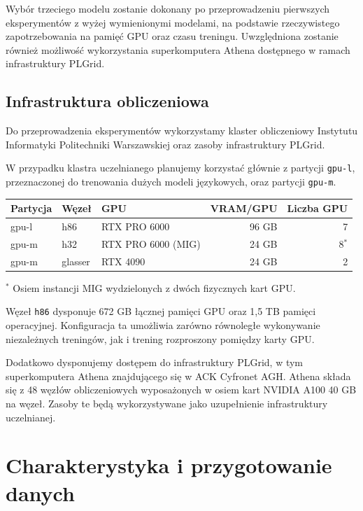 \documentclass[a4paper,10pt]{article}
\begin{document}
Wybór trzeciego modelu zostanie dokonany po przeprowadzeniu
pierwszych eksperymentów z wyżej wymienionymi modelami,
na podstawie rzeczywistego zapotrzebowania na pamięć GPU
oraz czasu treningu. Uwzględniona zostanie również
możliwość wykorzystania superkomputera Athena dostępnego
w ramach infrastruktury PLGrid.

\subsection{Infrastruktura obliczeniowa}

Do przeprowadzenia eksperymentów wykorzystamy klaster
obliczeniowy Instytutu Informatyki Politechniki
Warszawskiej oraz zasoby infrastruktury PLGrid.

W przypadku klastra uczelnianego planujemy korzystać
głównie z partycji \texttt{gpu-l}, przeznaczonej
do trenowania dużych modeli językowych, oraz
partycji \texttt{gpu-m}.

\begin{center}
    \begin{tabular}{lllrr}
        \toprule
        Partycja & Węzeł & GPU & VRAM/GPU & Liczba GPU \\
        \midrule
        gpu-l & h86 & RTX PRO 6000 & 96 GB & 7 \\
        gpu-m & h32 & RTX PRO 6000 (MIG) & 24 GB & 8$^*$ \\
        gpu-m & glasser & RTX 4090 & 24 GB & 2 \\
        \bottomrule
    \end{tabular}

    \small
    $^*$ Osiem instancji MIG wydzielonych z dwóch
    fizycznych kart GPU.
\end{center}

Węzeł \texttt{h86} dysponuje 672 GB łącznej pamięci
GPU oraz 1,5 TB pamięci operacyjnej. Konfiguracja ta
umożliwia zarówno równoległe wykonywanie niezależnych
treningów, jak i trening rozproszony pomiędzy karty GPU.

Dodatkowo dysponujemy dostępem do infrastruktury PLGrid,
w tym superkomputera Athena znajdującego się w ACK
Cyfronet AGH. Athena składa się z 48 węzłów
obliczeniowych wyposażonych w osiem kart NVIDIA A100
40 GB na węzeł. Zasoby te będą wykorzystywane jako uzupełnienie
infrastruktury uczelnianej.

\section{Charakterystyka i przygotowanie danych}
\end{document}
